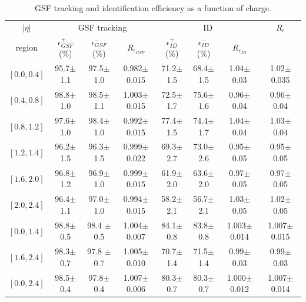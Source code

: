 \begin{table}[htbp]
\begin{center}
\begin{sideways}
\begin{tabular}{cccccccc}
    \toprule
$|\eta|$  & \multicolumn{3}{c}{GSF tracking } & \multicolumn{3}{c}{ID } & $R_\epsilon$ \\
region    & $\epsilon_{GSF}^+$ (\%) &$\epsilon_{GSF}^-$ (\%) & $R_{\epsilon_{GSF}}$ 
                                              & $\epsilon_{ID}^+$ (\%) &$\epsilon_{ID}^-$ (\%) & $R_{\epsilon_{ID}}$ &  \\
\midrule
$\left[ 0.0,0.4 \right]$ & 95.7$\pm$1.1 & 97.5$\pm$1.0 & 0.982$\pm$0.015 & 71.2$\pm$1.5 & 68.4$\pm$1.5 & 1.04$\pm$0.03 &1.02$\pm$0.035  \\
$\left[ 0.4,0.8 \right]$ & 98.8$\pm$ 1.0& 98.5$\pm$1.1 & 1.003$\pm$0.015 & 72.5$\pm$1.7 & 75.6$\pm$1.6 & 0.96$\pm$0.04 &0.96$\pm$ 0.04 \\
$\left[ 0.8,1.2 \right]$ & 97.6$\pm$ 1.0& 98.4$\pm$1.0 & 0.992$\pm$0.015 & 77.4$\pm$1.5 & 74.4$\pm$1.7 & 1.04$\pm$0.04 &1.03$\pm$ 0.04 \\
$\left[ 1.2,1.4 \right]$ & 96.2$\pm$ 1.5& 96.3$\pm$1.5 & 0.999$\pm$0.022 & 69.3$\pm$2.7 & 73.0$\pm$2.6 & 0.95$\pm$0.05 &0.95$\pm$0.05  \\
$\left[ 1.6,2.0 \right]$ & 96.8$\pm$ 1.2& 96.9$\pm$1.0 & 0.999$\pm$0.015 & 61.9$\pm$2.0 & 63.6$\pm$2.0 & 0.97$\pm$0.05 &0.97$\pm$0.05  \\
$\left[ 2.0,2.4 \right]$ & 96.4$\pm$ 1.1& 97.0$\pm$1.0 & 0.994$\pm$0.015 & 58.2$\pm$2.1 & 56.7$\pm$2.1 & 1.03$\pm$0.05 &1.02$\pm$0.05  \\
\midrule
$\left[ 0.0,1.4 \right]$ & 98.8$\pm$0.5 & 98.4 $\pm$0.5 & 1.004$\pm$0.007 & 84.1$\pm$0.8 & 83.8$\pm$0.8 & 1.003$\pm$0.014 & 1.007$\pm$ 0.015 \\
$\left[ 1.6,2.4 \right]$ & 98.3$\pm$0.7 & 97.8 $\pm$0.7 & 1.005$\pm$0.010 & 70.7$\pm$1.4 & 71.5$\pm$1.4 & 0.99$\pm$0.03 &0.99$\pm$ 0.03 \\
\midrule 
$\left[ 0.0,2.4 \right]$ & 98.5$\pm$0.4 & 97.8$\pm$0.4 & 1.007$\pm$0.006 & 80.3$\pm$0.7 & 80.3$\pm$0.7 & 1.000$\pm$0.012 &1.007$\pm$0.014  \\
    \bottomrule
\end{tabular}
\end{sideways}
\end{center}
\caption{ GSF tracking and identification efficiency as a function of charge.}
\label{asym36:tagprobe}
\end{table}

